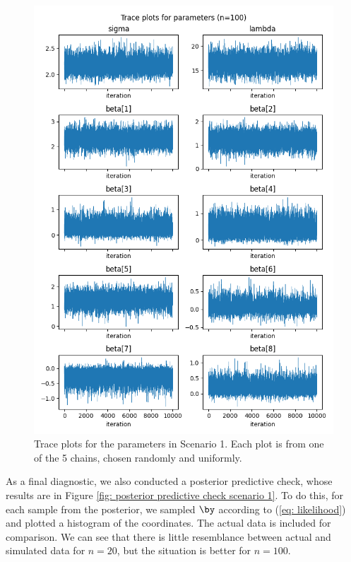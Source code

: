 \documentclass[a4paper, 10pt]{article}
\begin{document}
\begin{figure}[htb]
\begin{center}
        \includegraphics[height=.4\textheight]{../outputs/artificial_scenarios_n=100/scenario_1/traceplots.png}
    \end{center}
    \caption[Trace plots for the parameters in Scenario 1.]{Trace plots for the parameters in Scenario 1. Each plot is from one of the 5 chains, chosen randomly and uniformly.}
    \label{fig: traceplots scenario 1}
\end{figure}
As a final diagnostic, we also conducted a posterior predictive check, whose results are in Figure \ref{fig: posterior predictive check scenario 1}.
To do this, for each sample from the posterior, we sampled $ \by $ according to (\ref{eq: likelihood}) and plotted a histogram of the coordinates.
The actual data is included for comparison.
We can see that there is little resemblance between actual and simulated data for $ n = 20 $, but the situation is better for $ n = 100 $.
\end{document}

